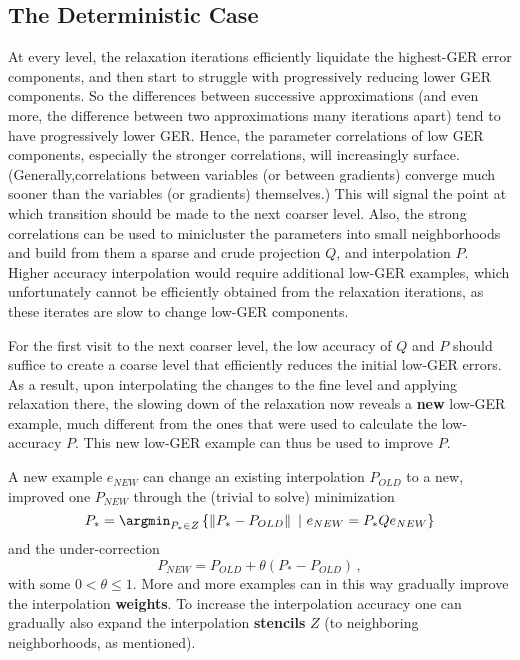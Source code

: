 \documentclass{article} %
\begin{document}
\subsection{The Deterministic Case}
At every level, the relaxation iterations efficiently liquidate the highest-GER error components, and then start to struggle with progressively reducing lower GER components. So the differences between successive approximations (and even more, the difference between two approximations many iterations apart) tend to have progressively lower GER. Hence, the parameter correlations of low GER components, especially the stronger correlations, will increasingly surface. (Generally,correlations between variables (or between gradients) converge much sooner than the variables (or gradients) themselves.) This will signal the point at which transition should be made to the next coarser level. Also, the strong correlations can be used to minicluster the parameters into small neighborhoods and build from them a sparse and crude projection $Q$, and interpolation $P$. Higher accuracy interpolation would require additional low-GER examples, which unfortunately cannot be efficiently obtained from the relaxation iterations, as these iterates are slow to change low-GER components.

For the first visit to the next coarser level, the low accuracy of $Q$ and $P$ should suffice to create a coarse level that efficiently reduces the initial low-GER errors. As a result, upon interpolating the changes to the fine level and applying relaxation there, the slowing down of the relaxation now reveals a \textbf{new} low-GER example, much different from the ones that were used to calculate the low-accuracy $P$. This new low-GER example can thus be used to improve $P$.

A new example $e_{NEW}$ can change an existing interpolation $P_{OLD}$ to a new, improved one $P_{NEW}$ through the (trivial to solve) minimization
\begin{equation}
  P_* = \argmin_{P_* \in Z} \left\{ \left\| P_* - P_{OLD} \right\| \,\, | \,\, e_{NEW} = P_* Q e_{NEW} \right\}
\label{p_star}
\end{equation}
and the under-correction
$$
  P_{NEW} = P_{OLD} + \theta \left( P_* - P_{OLD} \right)\,,
$$
with some $0 < \theta \leq 1$. More and more examples can in this way gradually improve the interpolation \textbf{weights}. To increase the interpolation accuracy one can gradually also expand the interpolation \textbf{stencils} $Z$ (to neighboring neighborhoods, as mentioned).
\end{document}
